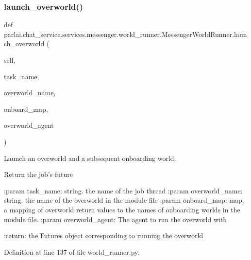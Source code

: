 \subsubsection{\texorpdfstring{launch\+\_\+overworld()}{launch\_overworld()}}
{\footnotesize\ttfamily def parlai.\+chat\+\_\+service.\+services.\+messenger.\+world\+\_\+runner.\+Messenger\+World\+Runner.\+launch\+\_\+overworld (\begin{DoxyParamCaption}\item[{}]{self,  }\item[{}]{task\+\_\+name,  }\item[{}]{overworld\+\_\+name,  }\item[{}]{onboard\+\_\+map,  }\item[{}]{overworld\+\_\+agent }\end{DoxyParamCaption})}

\begin{DoxyVerb}Launch an overworld and a subsequent onboarding world.

Return the job's future

:param task_name:
    string. the name of the job thread
:param overworld_name:
    string. the name of the overworld in the module file
:param onboard_map:
    map. a mapping of overworld return values to the names
    of onboarding worlds in the module file.
:param overworld_agent:
    The agent to run the overworld with

:return:
    the Futures object corresponding to running the overworld
\end{DoxyVerb}
 

Definition at line 137 of file world\+\_\+runner.\+py.


